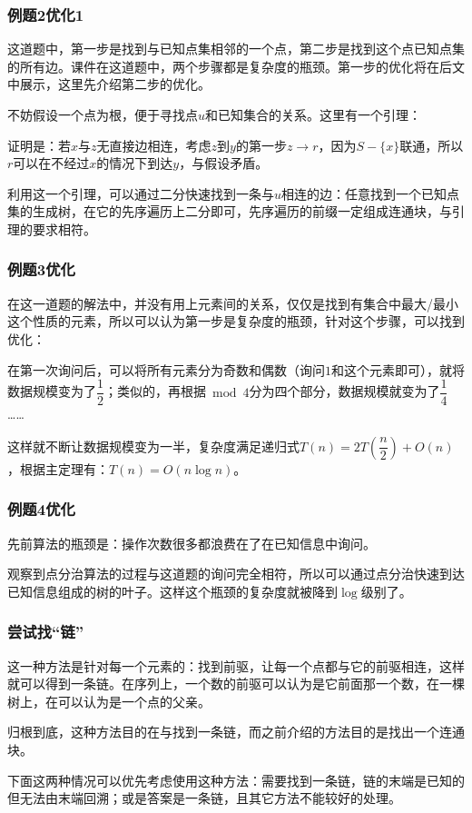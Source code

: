 \documentclass[10pt]{beamer}
\begin{document}
	\begin{frame}
		\frametitle{例题2优化1}

		这道题中，第一步是找到与已知点集相邻的一个点，第二步是找到这个点已知点集的所有边。课件在这道题中，两个步骤都是复杂度的瓶颈。第一步的优化将在后文中展示，这里先介绍第二步的优化。
		
		不妨假设一个点为根，便于寻找点$u$和已知集合的关系。这里有一个引理：
		
		{}
		
		证明是：若$x$与$z$无直接边相连，考虑$z$到$y$的第一步$z\rightarrow r$，因为$S-\{x\}$联通，所以$r$可以在不经过$x$的情况下到达$y$，与假设矛盾。
		
		利用这一个引理，可以通过二分快速找到一条与$u$相连的边：任意找到一个已知点集的生成树，在它的先序遍历上二分即可，先序遍历的前缀一定组成连通块，与引理的要求相符。
	
	\end{frame}
	\begin{frame}
		\frametitle{例题3优化}
		
		在这一道题的解法中，并没有用上元素间的关系，仅仅是找到有集合中最大/最小这个性质的元素，所以可以认为第一步是复杂度的瓶颈，针对这个步骤，可以找到优化：
		
		在第一次询问后，可以将所有元素分为奇数和偶数（询问$1$和这个元素即可），就将数据规模变为了$\dfrac 12$；类似的，再根据$\bmod 4$分为四个部分，数据规模就变为了$\dfrac 14$……
		
		这样就不断让数据规模变为一半，复杂度满足递归式$T(n)=2T(\dfrac n2)+O(n)$，根据主定理有：$T(n)=O(n\log n)$。
		
	
	\end{frame}
	\begin{frame}
		\frametitle{例题4优化}
		
		先前算法的瓶颈是：操作次数很多都浪费在了在已知信息中询问。
		
		观察到点分治算法的过程与这道题的询问完全相符，所以可以通过点分治快速到达已知信息组成的树的叶子。这样这个瓶颈的复杂度就被降到$\log$级别了。
		
	
	\end{frame}
	\begin{frame}
		\frametitle{尝试找“链”}
	
		这一种方法是针对每一个元素的：找到前驱，让每一个点都与它的前驱相连，这样就可以得到一条链。在序列上，一个数的前驱可以认为是它前面那一个数，在一棵树上，在可以认为是一个点的父亲。

		归根到底，这种方法目的在与找到一条链，而之前介绍的方法目的是找出一个连通块。

		下面这两种情况可以优先考虑使用这种方法：需要找到一条链，链的末端是已知的但无法由末端回溯；或是答案是一条链，且其它方法不能较好的处理。
	\end{frame}
\end{document}
